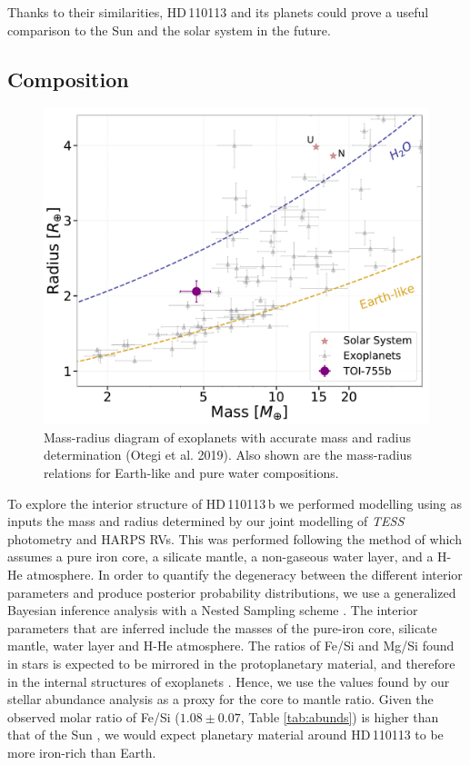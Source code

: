 \documentclass[fleqn,usenatbib]{mnras}
\newcommand{\tess}{{\it TESS}}
\newcommand{\harps}{{HARPS}}
\newcommand{\Tstar}{HD\,110113}
\newcommand{\Tplanet}{HD\,110113\,b}
\begin{document}
Thanks to their similarities, \Tstar{} and its planets could prove a useful comparison to the Sun and the solar system in the future.

\subsection{Composition}\label{sect:internal}

\begin{figure}
	\includegraphics[width=\columnwidth]{MR_755_Jon}
    \caption{Mass-radius diagram of exoplanets with accurate mass and radius determination (Otegi et al. 2019). Also shown are the mass-radius relations for Earth-like and pure water compositions.\label{fig:MR_Diagram}
    }
\end{figure}

To explore the interior structure of \Tplanet{} we performed modelling using as inputs the mass and radius determined by our joint modelling of \tess{} photometry and \harps{} RVs.
This was performed following the method of \citet{otegi2020revisited} which assumes a pure iron core, a silicate mantle, a non-gaseous water layer, and a H-He atmosphere.
In order to quantify the degeneracy between the different interior parameters and produce posterior probability distributions, we use a generalized Bayesian inference analysis with a Nested Sampling scheme \citep[e.g.][]{2014A&A...564A.125B}.
The interior parameters that are inferred include the masses of the pure-iron core, silicate mantle, water layer and H-He atmosphere.
The ratios of Fe/Si and Mg/Si found in stars is expected to be mirrored in the protoplanetary material, and therefore in the internal structures of exoplanets \citep{thiabaud2015elemental}.
Hence, we use the values found by our stellar abundance analysis as a proxy for the core to mantle ratio.
Given the observed molar ratio of Fe/Si ($1.08\pm0.07$, Table \ref{tab:abunds}) is higher than that of the Sun  \citep[0.86,][]{thiabaud2015elemental}, we would expect planetary material around \Tstar{} to be more iron-rich than Earth.
\end{document}

